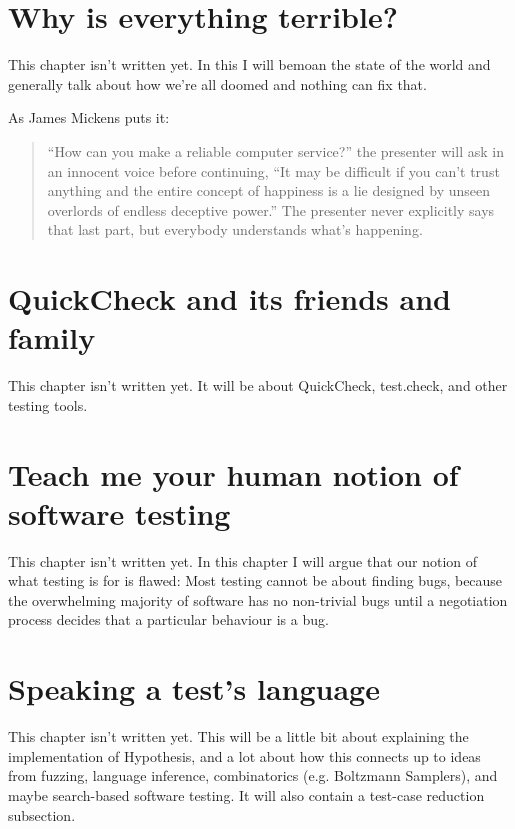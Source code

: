 \chapter{Why is everything terrible?}

This chapter isn't written yet.
In this I will bemoan the state of the world and generally talk about how we're all doomed and nothing can fix that.

As James Mickens puts it\cite{mickens2014saddest}:

\begin{quote}
``How can you make a reliable computer service?'' the presenter will ask in an innocent voice before continuing,
``It may be difficult if you can’t trust anything and the entire concept of happiness is a lie designed by unseen overlords of endless deceptive power.''
The presenter never explicitly says that last part,
but everybody understands what's happening.
\end{quote}

\chapter{QuickCheck and its friends and family}\label{chap:quickcheck}

This chapter isn't written yet.
It will be about QuickCheck, test.check,
and other testing tools.

\chapter{Teach me your human notion of software testing}\label{chap:purposesoftesting}

This chapter isn't written yet.
In this chapter I will argue that our notion of what testing is for is flawed:
Most testing cannot be about finding bugs,
because the overwhelming majority of software has no non-trivial bugs until a negotiation process decides that a particular behaviour is a bug.

\chapter{Speaking a test's language}\label{chap:testinglanguage}

This chapter isn't written yet.
This will be a little bit about explaining the implementation of Hypothesis,
and a lot about how this connects up to ideas from fuzzing, language inference, combinatorics (e.g. Boltzmann Samplers), and maybe search-based software testing.
It will also contain a test-case reduction subsection.

